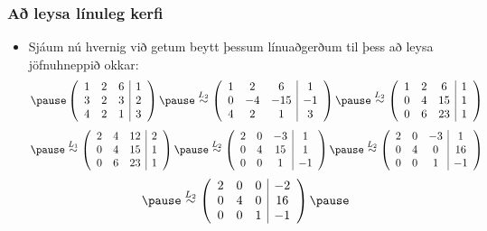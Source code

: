 \documentclass{beamer}
\begin{document}
\begin{frame}
	\frametitle{Að leysa línuleg kerfi}
	\begin{itemize}
		\item Sjáum nú hvernig við getum beytt þessum línuaðgerðum til þess að leysa jöfnuhneppið okkar:
			\[
				\pause
				\left (
				\begin{array}{c c c | c}
					1 & 2 & 6 & 1\\
					3 & 2 & 3 & 2\\
					4 & 2 & 1 & 3
				\end{array}
				\right )
				\pause
				\stackrel{L_2}{\sim}
				\left (
				\begin{array}{c c c | c}
					1 & 2 & 6 & 1\\
					0 & -4 & -15 & -1\\
					4 & 2 & 1 & 3
				\end{array}
				\right )
				\pause
				\stackrel{L_2}{\sim}
				\left (
				\begin{array}{c c c | c}
					1 & 2 & 6 & 1\\
					0 & 4 & 15 & 1\\
					0 & 6 & 23 & 1
				\end{array}
				\right )
			\]
			\[
				\pause
				\stackrel{L_1}{\sim}
				\left (
				\begin{array}{c c c | c}
					2 & 4 & 12 & 2\\
					0 & 4 & 15 & 1\\
					0 & 6 & 23 & 1
				\end{array}
				\right )
				\pause
				\stackrel{L_2}{\sim}
				\left (
				\begin{array}{c c c | c}
					2 & 0 & -3 & 1\\
					0 & 4 & 15 & 1\\
					0 & 0 & 1 & -1
				\end{array}
				\right )
				\pause
				\stackrel{L_2}{\sim}
				\left (
				\begin{array}{c c c | c}
					2 & 0 & -3 & 1\\
					0 & 4 & 0 & 16\\
					0 & 0 & 1 & -1
				\end{array}
				\right )
			\]
			\[
				\pause
				\stackrel{L_2}{\sim}
				\left (
				\begin{array}{c c c | c}
					2 & 0 & 0 & -2\\
					0 & 4 & 0 & 16\\
					0 & 0 & 1 & -1
				\end{array}
				\right )
				\pause
\]
\end{itemize}
\end{frame}
\end{document}
